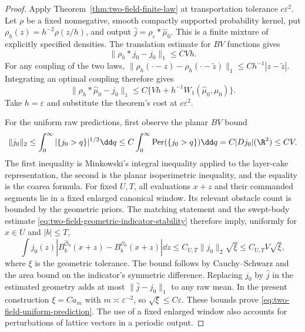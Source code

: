 \begin{proof}
Apply Theorem~\ref{thm:two-field-finite-law} at transportation
tolerance $c\varepsilon^2$.  Let $\rho$ be a fixed nonnegative,
smooth compactly supported probability kernel, put
$\rho_h(z)=h^{-2}\rho(z/h)$, and output
$\widehat j=\rho_\varepsilon*\widehat\mu_0$.
This is a finite mixture of explicitly specified densities.
The translation estimate for $BV$ functions gives
\[
 \|\rho_h*j_0-j_0\|_1\le CVh.
\]
For any coupling of the two laws,
$\|\rho_h(\cdot-z)-\rho_h(\cdot-\widetilde z)\|_1
\le C h^{-1}|z-\widetilde z|$.
Integrating an optimal coupling therefore gives
\[
 \|\rho_h*\widehat\mu_0-j_0\|_1
          \le C\{Vh+h^{-1}W_1(\widehat\mu_0,\mu_0)\}.
\]
Take $h=\varepsilon$ and substitute the theorem's cost at
$c\varepsilon^2$.

For the uniform raw predictions, first observe the planar $BV$
bound
\[
 \|j_0\|_2
 \le\int_0^\infty |\{j_0>q\}|^{1/2}\dd q
 \le C\int_0^\infty\operatorname{Per}(\{j_0>q\})\dd q
 =C|Dj_0|(\R^2)\le CV.
\]
The first inequality is Minkowski's integral inequality applied to
the layer-cake representation, the second is the planar
isoperimetric inequality, and the equality is the coarea formula.
For fixed $U,T$, all evaluations $x+z$ and their commanded segments
lie in a fixed enlarged canonical window.  Its relevant obstacle
count is bounded by the geometric priors.  The matching statement
and the swept-body estimate
\eqref{eq:two-field-geometric-indicator-stability} therefore imply,
uniformly for $x\in U$ and $|b|\le T$,
\[
 \int j_0(z)
  |B_b^{\widehat{\mathcal O}_0}(x+z)
       -B_b^{\mathcal O_0}(x+z)|\dd z
                 \le C_{U,T}\|j_0\|_2\sqrt\xi
                 \le C_{U,T}V\sqrt\xi,
\]
where $\xi$ is the geometric tolerance.  The bound follows by
Cauchy--Schwarz and the area bound on the indicator's symmetric
difference.  Replacing $j_0$ by $\widehat j$ in the estimated
geometry adds at most $\|\widehat j-j_0\|_1$ to any raw mean.
In the present construction $\xi=Ca_m$ with
$m\asymp\varepsilon^{-2}$, so $\sqrt\xi\le C\varepsilon$.
These bounds prove \eqref{eq:two-field-uniform-prediction}.
The use of a fixed enlarged window also accounts for perturbations
of lattice vectors in a periodic output.
\end{proof}
